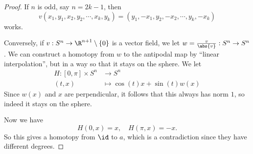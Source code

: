 \documentclass[a4paper]{article}
\theoremstyle{definition}
\begin{document}
\begin{proof}
  If $n$ is odd, say $n = 2k - 1$, then
  \[
    v(x_1, y_1, x_2, y_2, \cdots, x_k, y_k) = (y_1, -x_1, y_2, -x_2, \cdots, y_k, -x_k)
  \]
  works.

  Conversely, if $v: S^n \to \R^{n + 1} \setminus \{0\}$ is a vector field, we let $w = \frac{v}{\abs{v}}: S^n \to S^n$. We can construct a homotopy from $w$ to the antipodal map by ``linear interpolation'', but in a way so that it stays on the sphere. We let
  \begin{align*}
    H: [0, \pi] \times S^n &\to S^n\\
    (t, x) &\mapsto \cos(t) x + \sin(t) w(x)
  \end{align*}
  Since $w(x)$ and $x$ are perpendicular, it follows that this always has norm $1$, so indeed it stays on the sphere.

  Now we have
  \[
    H(0, x) = x,\quad H(\pi, x) = -x.
  \]
  So this gives a homotopy from $\id$ to $a$, which is a contradiction since they have different degrees.
\end{proof}
\end{document}
